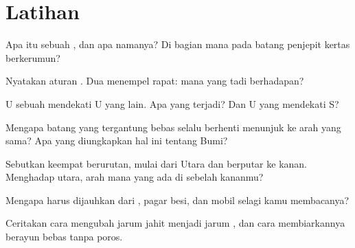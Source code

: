 \section{Latihan}

\begin{exercise}[$\star$]\label{exo:g4:magnets-and-compass:1}
Apa itu  sebuah , dan apa namanya? Di bagian mana pada
 batang penjepit kertas berkerumun?
\end{exercise}

\begin{exercise}[$\star$]\label{exo:g4:magnets-and-compass:2}
Nyatakan aturan . Dua  menempel rapat:  mana yang tadi
berhadapan?
\end{exercise}

\begin{exercise}[$\star$]\label{exo:g4:magnets-and-compass:3}
 U sebuah  mendekati  U  yang lain. Apa yang
terjadi? Dan U yang mendekati S?
\end{exercise}

\begin{exercise}[$\star$]\label{exo:g4:magnets-and-compass:4}
Mengapa  batang yang tergantung bebas selalu berhenti menunjuk
ke arah yang sama? Apa yang diungkapkan hal ini tentang Bumi?
\end{exercise}

\begin{exercise}[$\star$]\label{exo:g4:magnets-and-compass:5}
Sebutkan keempat  berurutan, mulai dari Utara dan
berputar ke kanan. Menghadap utara, arah mana yang ada di sebelah
kananmu?
\end{exercise}

\begin{exercise}[$\star$]\label{exo:g4:magnets-and-compass:6}
Mengapa  harus dijauhkan dari , pagar besi, dan mobil
selagi kamu membacanya?
\end{exercise}

\begin{exercise}[$\star$]\label{exo:g4:magnets-and-compass:7}
Ceritakan cara mengubah jarum jahit menjadi jarum , dan cara
membiarkannya berayun bebas tanpa poros.
\end{exercise}

